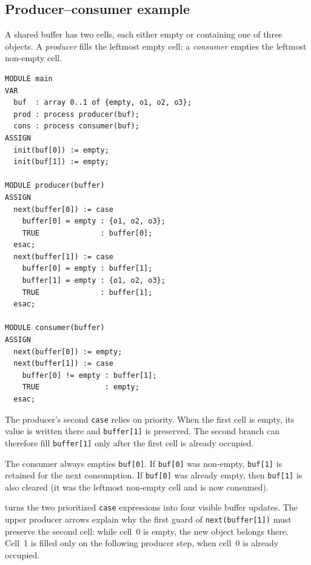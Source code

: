 \subsection{Producer--consumer example}
\label{sec:prod-cons}

\begin{example}
\label{ex:prod-cons}
A shared buffer has two cells, each either empty or containing one of three
objects.  A \emph{producer} fills the leftmost empty cell; a \emph{consumer}
empties the leftmost non-empty cell.

\begin{verbatim}
MODULE main
VAR
  buf  : array 0..1 of {empty, o1, o2, o3};
  prod : process producer(buf);
  cons : process consumer(buf);
ASSIGN
  init(buf[0]) := empty;
  init(buf[1]) := empty;

MODULE producer(buffer)
ASSIGN
  next(buffer[0]) := case
    buffer[0] = empty : {o1, o2, o3};
    TRUE              : buffer[0];
  esac;
  next(buffer[1]) := case
    buffer[0] = empty : buffer[1];
    buffer[1] = empty : {o1, o2, o3};
    TRUE              : buffer[1];
  esac;

MODULE consumer(buffer)
ASSIGN
  next(buffer[0]) := empty;
  next(buffer[1]) := case
    buffer[0] != empty : buffer[1];
    TRUE               : empty;
  esac;
\end{verbatim}

The producer's second \texttt{case} relies on priority.  When the first cell
is empty, its value is written there and \texttt{buffer[1]} is preserved.  The
second branch can therefore fill \texttt{buffer[1]} only after the first cell
is already occupied.

The consumer always empties \texttt{buf[0]}.  If \texttt{buf[0]} was
non-empty, \texttt{buf[1]} is retained for the next consumption.  If
\texttt{buf[0]} was already empty, then \texttt{buf[1]} is also cleared
(it was the leftmost non-empty cell and is now consumed).
\end{example}

 turns the two prioritized
\texttt{case} expressions into four visible buffer updates.  The upper
producer arrows explain why the first guard of
\texttt{next(buffer[1])} must preserve the second cell: while cell~0 is
empty, the new object belongs there.  Cell~1 is filled only on the following
producer step, when cell~0 is already occupied.

